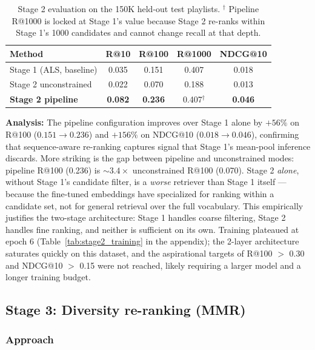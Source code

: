 \documentclass[11pt,a4paper]{article}
\begin{document}
\begin{table}[H]
\centering
\begin{tabular}{lcccc}
\toprule
\textbf{Method} & \textbf{R@10} & \textbf{R@100} & \textbf{R@1000} & \textbf{NDCG@10} \\
\midrule
Stage 1 (ALS, baseline) & 0.035 & 0.151 & 0.407 & 0.018 \\
Stage 2 unconstrained & 0.022 & 0.070 & 0.188 & 0.013 \\
\textbf{Stage 2 pipeline} & \textbf{0.082} & \textbf{0.236} & 0.407$^\dagger$ & \textbf{0.046} \\
\bottomrule
\end{tabular}
\caption{Stage 2 evaluation on the 150K held-out test playlists. $^\dagger$ Pipeline R@1000 is locked at Stage 1's value because Stage 2 re-ranks within Stage 1's 1000 candidates and cannot change recall at that depth.}
\label{tab:stage2_results}
\end{table}

\textbf{Analysis:} The pipeline configuration improves over Stage 1 alone by $+56\%$ on R@100 ($0.151 \to 0.236$) and $+156\%$ on NDCG@10 ($0.018 \to 0.046$), confirming that sequence-aware re-ranking captures signal that Stage 1's mean-pool inference discards. More striking is the gap between pipeline and unconstrained modes: pipeline R@100 (0.236) is $\sim 3.4\times$ unconstrained R@100 (0.070). Stage 2 \emph{alone}, without Stage 1's candidate filter, is a \emph{worse} retriever than Stage 1 itself --- because the fine-tuned embeddings have specialized for ranking within a candidate set, not for general retrieval over the full vocabulary. This empirically justifies the two-stage architecture: Stage 1 handles coarse filtering, Stage 2 handles fine ranking, and neither is sufficient on its own. Training plateaued at epoch 6 (Table~\ref{tab:stage2_training} in the appendix); the 2-layer architecture saturates quickly on this dataset, and the aspirational targets of R@100 $>$ 0.30 and NDCG@10 $>$ 0.15 were not reached, likely requiring a larger model and a longer training budget.

\subsection{Stage 3: Diversity re-ranking (MMR)}

\subsubsection{Approach}
\end{document}
